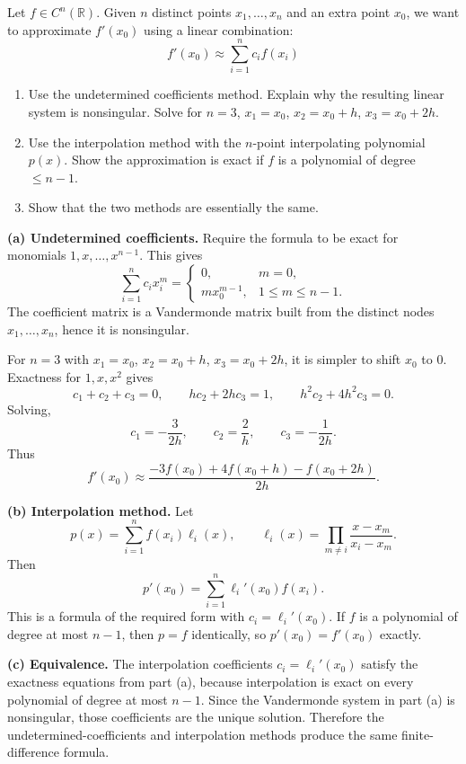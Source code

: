 \begin{exercise}
\label{applied:2017:9}
Let $f \in C^n(\mathbb{R})$. Given $n$ distinct points $x_1, \dots, x_n$ and an extra point $x_0$, we want to approximate $f'(x_0)$ using a linear combination:
\[
f'(x_0) \approx \sum_{i=1}^n c_i f(x_i)
\]
\begin{enumerate}
    \item[(a)] Use the undetermined coefficients method. Explain why the resulting linear system is nonsingular. Solve for $n=3$, $x_1=x_0$, $x_2=x_0+h$, $x_3=x_0+2h$.
    \item[(b)] Use the interpolation method with the $n$-point interpolating polynomial $p(x)$. Show the approximation is exact if $f$ is a polynomial of degree $\leq n-1$.
    \item[(c)] Show that the two methods are essentially the same.
\end{enumerate}
\end{exercise}

\begin{solution}
\textbf{(a) Undetermined coefficients.}
Require the formula to be exact for monomials $1,x,\dots,x^{n-1}$.  This gives
\[
\sum_{i=1}^n c_i x_i^m=
\begin{cases}
0,&m=0,\\
m x_0^{m-1},&1\leq m\leq n-1.
\end{cases}
\]
The coefficient matrix is a Vandermonde matrix built from the distinct nodes $x_1,\dots,x_n$, hence it is nonsingular.

For $n=3$ with $x_1=x_0$, $x_2=x_0+h$, $x_3=x_0+2h$, it is simpler to shift $x_0$ to $0$.  Exactness for $1,x,x^2$ gives
\[
c_1+c_2+c_3=0,\qquad hc_2+2hc_3=1,\qquad h^2c_2+4h^2c_3=0.
\]
Solving,
\[
c_1=-\frac{3}{2h},\qquad c_2=\frac{2}{h},\qquad c_3=-\frac{1}{2h}.
\]
Thus
\[
f'(x_0)\approx \frac{-3f(x_0)+4f(x_0+h)-f(x_0+2h)}{2h}.
\]

\textbf{(b) Interpolation method.}
Let
\[
p(x)=\sum_{i=1}^n f(x_i)\ell_i(x),
\qquad
\ell_i(x)=\prod_{m\neq i}\frac{x-x_m}{x_i-x_m}.
\]
Then
\[
p'(x_0)=\sum_{i=1}^n \ell_i'(x_0)f(x_i).
\]
This is a formula of the required form with $c_i=\ell_i'(x_0)$.  If $f$ is a polynomial of degree at most $n-1$, then $p=f$ identically, so $p'(x_0)=f'(x_0)$ exactly.

\textbf{(c) Equivalence.}
The interpolation coefficients $c_i=\ell_i'(x_0)$ satisfy the exactness equations from part (a), because interpolation is exact on every polynomial of degree at most $n-1$.  Since the Vandermonde system in part (a) is nonsingular, those coefficients are the unique solution.  Therefore the undetermined-coefficients and interpolation methods produce the same finite-difference formula.
\end{solution}

